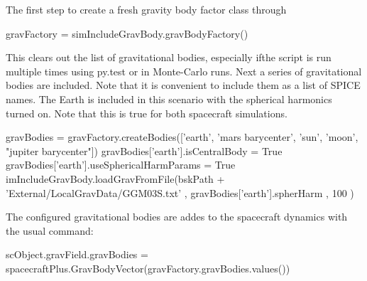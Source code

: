 The first step to create a fresh gravity body factor class through 
\begin{DoxyCode}
gravFactory = simIncludeGravBody.gravBodyFactory()
\end{DoxyCode}
 This clears out the list of gravitational bodies, especially ifthe script is run multiple times using \textquotesingle{}py.\+test\textquotesingle{} or in Monte-\/\+Carlo runs. Next a series of gravitational bodies are included. Note that it is convenient to include them as a list of S\+P\+I\+CE names. The Earth is included in this scenario with the spherical harmonics turned on. Note that this is true for both spacecraft simulations. 
\begin{DoxyCode}
gravBodies = gravFactory.createBodies([\textcolor{stringliteral}{'earth'}, \textcolor{stringliteral}{'mars barycenter'}, \textcolor{stringliteral}{'sun'}, \textcolor{stringliteral}{'moon'}, \textcolor{stringliteral}{"jupiter barycenter"}])
gravBodies[\textcolor{stringliteral}{'earth'}].isCentralBody = \textcolor{keyword}{True}
gravBodies[\textcolor{stringliteral}{'earth'}].useSphericalHarmParams = \textcolor{keyword}{True}
imIncludeGravBody.loadGravFromFile(bskPath + \textcolor{stringliteral}{'External/LocalGravData/GGM03S.txt'}
                                 , gravBodies[\textcolor{stringliteral}{'earth'}].spherHarm
                                 , 100
                                 )
\end{DoxyCode}
 The configured gravitational bodies are addes to the spacecraft dynamics with the usual command\+: 
\begin{DoxyCode}
scObject.gravField.gravBodies = spacecraftPlus.GravBodyVector(gravFactory.gravBodies.values())
\end{DoxyCode}


